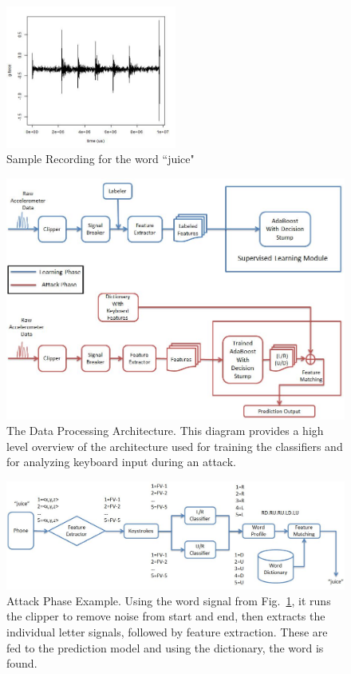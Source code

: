 \documentclass[11pt,conference]{IEEEtran}
\begin{document}
\begin{figure}
\centering
\includegraphics[width=0.5\textwidth]{img/juice}
\caption{Sample Recording for the word ``juice"}
\label{fig:juice}
\end{figure}

\begin{figure}
\centering
\includegraphics[width=.9\textwidth]{flowchart1}
\caption{The Data Processing Architecture. This diagram provides a high level overview of the architecture used for training the
classifiers and for analyzing keyboard input during an attack.}
\label{fig:flowchart1}
\end{figure}

\begin{figure}
\centering
\includegraphics[width=.9\textwidth]{flowchart2}
\caption{Attack Phase Example. Using the word signal from Fig.~\ref{fig:juice}, it runs the clipper to remove noise from
start and end, then extracts the individual letter signals, followed by feature extraction. These are fed to the prediction
model and using the dictionary, the word is found.}
\label{fig:flowchart2}
\end{figure}
\end{document}
